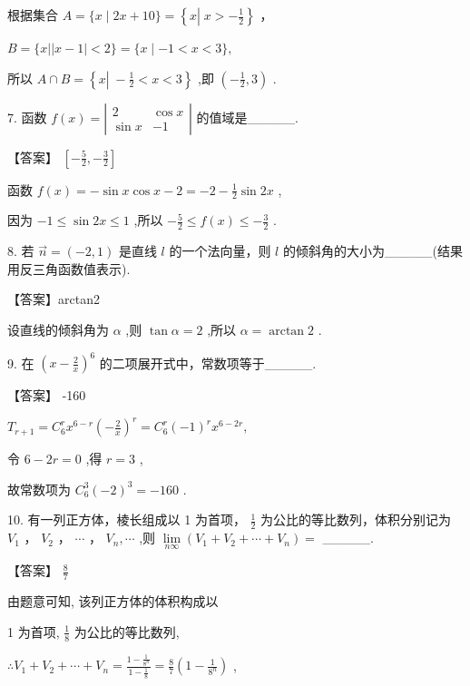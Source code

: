 \documentclass[10pt]{article}
\begin{document}
根据集合 \(A = \{ x \mid  {2x} + {10}\}  = \left\{  {x\left| {\;x >  - \frac{1}{2}}\right. }\right\}\) ，

\(B = \{ x\left| \right| x - 1 \mid   < 2\}  = \{ x \mid   - 1 < x < 3\} ,\)

所以 \(A \cap  B = \left\{  {x\left| {\; - \frac{1}{2} < x < 3}\right. }\right\}\) ,即 \(\left( {-\frac{1}{2},3}\right)\) .

7. 函数 \(f\left( x\right)  = \left| \begin{matrix} 2 & \cos x \\  \sin x &  - 1 \end{matrix}\right|\) 的值域是\_\_\_\_\_.

【答案】 \(\left\lbrack  {-\frac{5}{2}, - \frac{3}{2}}\right\rbrack\)

函数 \(f\left( x\right)  =  - \sin x\cos x - 2 =  - 2 - \frac{1}{2}\sin {2x}\) ,

因为 \(- 1 \leq  \sin {2x} \leq  1\) ,所以 \(- \frac{5}{2} \leq  f\left( x\right)  \leq   - \frac{3}{2}\) .

8. 若 \(\overrightarrow{n} = \left( {-2,1}\right)\) 是直线 \(l\) 的一个法向量，则 \(l\) 的倾斜角的大小为\_\_\_\_\_(结果用反三角函数值表示).

【答案】arctan2

设直线的倾斜角为 \(\alpha\) ,则 \(\tan \alpha  = 2\) ,所以 \(\alpha  = \arctan 2\) .

9. 在 \({\left( x - \frac{2}{x}\right) }^{6}\) 的二项展开式中，常数项等于\_\_\_\_\_.

【答案】 -160

\({T}_{r + 1} = {C}_{6}^{r}{x}^{6 - r}{\left( -\frac{2}{x}\right) }^{r} = {C}_{6}^{r}{\left( -1\right) }^{r}{x}^{6 - {2r}},\)

令 \(6 - {2r} = 0\) ,得 \(r = 3\) ,

故常数项为 \({C}_{6}^{3}{\left( -2\right) }^{3} =  - {160}\) .

10. 有一列正方体，棱长组成以 1 为首项， \(\frac{1}{2}\) 为公比的等比数列，体积分别记为 \({V}_{1}\) ， \({V}_{2}\) ， \(\cdots\) ， \({V}_{n},\cdots\) ,则 \(\mathop{\lim }\limits_{{n\infty }}\left( {{V}_{1} + {V}_{2} + \cdots  + {V}_{n}}\right)  =\) \_\_\_\_\_.

【答案】 \(\frac{8}{7}\)

由题意可知, 该列正方体的体积构成以

1 为首项, \(\frac{1}{8}\) 为公比的等比数列,

\(\therefore {V}_{1} + {V}_{2} + \cdots  + {V}_{n} = \frac{1 - \frac{1}{{8}^{n}}}{1 - \frac{1}{8}} = \frac{8}{7}\left( {1 - \frac{1}{{8}^{n}}}\right)\) ,
\end{document}
